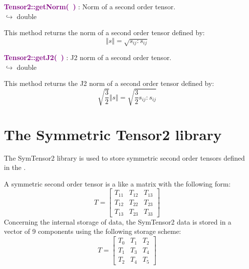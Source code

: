 \textcolor{purple}{\textbf{Tensor2::getNorm(~)}}\label{Tensor2::getNorm()} : Norm of a second order tensor.\\ \hspace*{5mm}$\hookrightarrow$ double

This method returns the norm of a second order tensor defined by:\begin{equation*}
\left\Vert s \right\Vert  = \sqrt {s_{ij}:s_{ij}}
\end{equation*}

\textcolor{purple}{\textbf{Tensor2::getJ2(~)}}\label{Tensor2::getJ2()} : J2 norm of a second order tensor.\\ \hspace*{5mm}$\hookrightarrow$ double

This method returns the J2 norm of a second order tensor defined by:
\begin{equation*}
\sqrt {\frac{3}{2}} \left\Vert s \right\Vert  = \sqrt {\frac{3}{2} s_{ij}:s_{ij}}
\end{equation*}

\section{The Symmetric Tensor2 library}

The SymTensor2 library is used to store symmetric second order tensors defined in the \DynELA.

A symmetric second order tensor is a like a matrix with the following form:
\begin{equation}
T=\left[\begin{array}{ccc}
  T_{11} & T_{12} & T_{13}\\
  T_{12} & T_{22} & T_{23}\\
  T_{13} & T_{23} & T_{33}
  \end{array}\right]
\end{equation}
Concerning the internal storage of data, the SymTensor2 data is stored in a vector of 9 components using the following storage scheme:
\begin{equation}
T=\left[\begin{array}{ccc}
    T_{0} & T_{1} & T_{2}\\
    T_{1} & T_{3} & T_{4}\\
    T_{2} & T_{4} & T_{5}
    \end{array}\right]
\end{equation}
